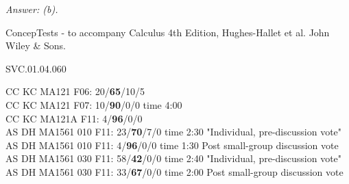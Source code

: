 {\it Answer: (b).} 

\medskip
ConcepTests - to accompany Calculus 4th Edition, Hughes-Hallet et al. John Wiley \& Sons.

SVC.01.04.060


CC KC MA121 F06: 20/{\bf 65}/10/5  \\
CC KC MA121 F07: 10/{\bf90}/0/0 time 4:00 \\
CC KC MA121A F11: 4/{\bf96}/0/0  \\
AS DH MA1561 010 F11: 23/{\bf70}/7/0 time 2:30 "Individual, pre-discussion vote" \\
AS DH MA1561 010 F11: 4/{\bf96}/0/0 time 1:30 Post small-group discussion vote \\
AS DH MA1561 030 F11: 58/{\bf42}/0/0 time 2:40 "Individual, pre-discussion vote" \\
AS DH MA1561 030 F11: 33/{\bf67}/0/0 time 2:00 Post small-group discussion vote \\
